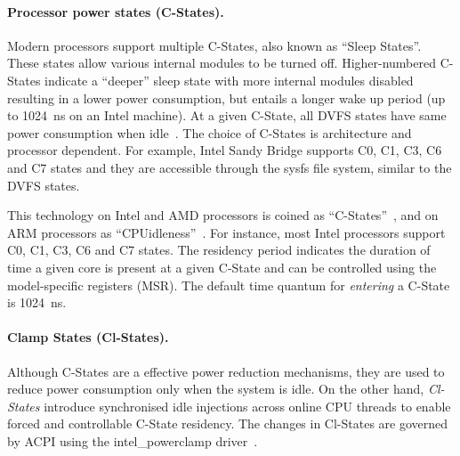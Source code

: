  \paragraph*{Processor power states (C-States).} Modern \muc processors
support multiple C-States, also known as ``Sleep States''. These states allow various
internal modules to be turned off. Higher-numbered C-States indicate a ``deeper'' sleep
state with more internal modules disabled resulting in a lower power consumption, but
entails a longer wake up period (up to \SI{1024}{\nano\second} on an Intel machine).  At
a given C-State, all DVFS states have same power consumption when
idle~\citep{Olsen:2006:PEP:1137248.1137532}.  The choice of C-States is architecture and
processor dependent. For example, Intel Sandy Bridge supports C0, C1, C3, C6 and C7 states
and they are accessible through the \textsf{sysfs} file system, similar to the DVFS states.

  This technology on Intel and AMD processors is coined as
``C-States''~\citep{Intel, Schone:2015:WLP:2766527.2766547}, and on ARM processors as
``CPUidleness''~\citep{maillistperfmon}. For instance, most Intel processors support C0,
C1, C3, C6 and C7 states.  The residency period indicates the duration of time a given
core is present at a given C-State and can be controlled using the model-specific
registers (MSR).  The default time quantum for \textit{entering} a C-State is
\SI{1024}{\nano\second}.  

\paragraph*{Clamp States (Cl-States).} Although C-States are a effective power reduction
mechanisms, they are used to reduce power consumption only when the system is idle.
On the other hand, \textit{Cl-States} introduce synchronised idle injections across online
CPU threads to enable forced and controllable C-State residency.  The changes in Cl-States
are governed by ACPI using the \textsf{intel\_powerclamp} driver~\citep{powerclamp}. 




